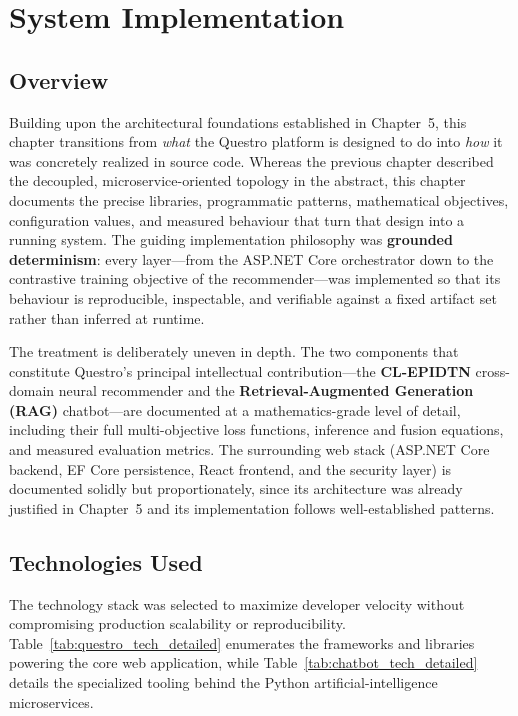 \chapter{System Implementation}

\section{Overview}
Building upon the architectural foundations established in Chapter~5, this chapter transitions from \textit{what} the Questro platform is designed to do into \textit{how} it was concretely realized in source code. Whereas the previous chapter described the decoupled, microservice-oriented topology in the abstract, this chapter documents the precise libraries, programmatic patterns, mathematical objectives, configuration values, and measured behaviour that turn that design into a running system. The guiding implementation philosophy was \textbf{grounded determinism}: every layer---from the ASP.NET Core orchestrator down to the contrastive training objective of the recommender---was implemented so that its behaviour is reproducible, inspectable, and verifiable against a fixed artifact set rather than inferred at runtime.

The treatment is deliberately uneven in depth. The two components that constitute Questro's principal intellectual contribution---the \textbf{CL-EPIDTN} cross-domain neural recommender and the \textbf{Retrieval-Augmented Generation (RAG)} chatbot---are documented at a mathematics-grade level of detail, including their full multi-objective loss functions, inference and fusion equations, and measured evaluation metrics. The surrounding web stack (ASP.NET Core backend, EF Core persistence, React frontend, and the security layer) is documented solidly but proportionately, since its architecture was already justified in Chapter~5 and its implementation follows well-established patterns.

\section{Technologies Used}
The technology stack was selected to maximize developer velocity without compromising production scalability or reproducibility. Table~\ref{tab:questro_tech_detailed} enumerates the frameworks and libraries powering the core web application, while Table~\ref{tab:chatbot_tech_detailed} details the specialized tooling behind the Python artificial-intelligence microservices.


